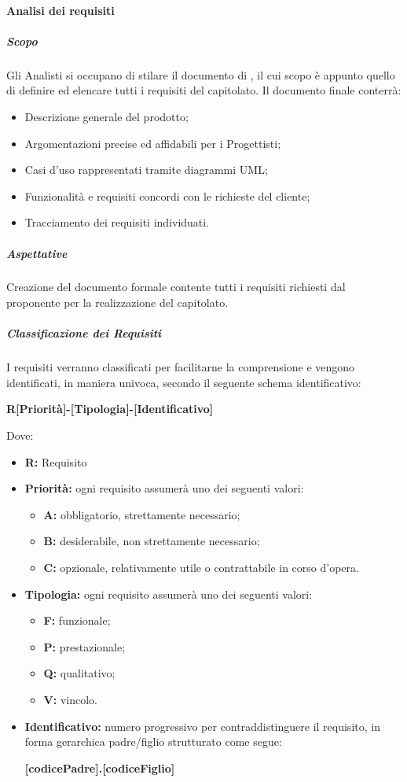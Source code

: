 			\paragraph{Analisi dei requisiti}
				\subparagraph{Scopo}
					Gli Analisti si occupano di stilare il documento di , il cui scopo è appunto quello di definire ed elencare tutti i requisiti del capitolato. Il documento finale conterrà:
					\begin{itemize}
						\item Descrizione generale del prodotto;
						\item Argomentazioni precise ed affidabili per i Progettisti;
						\item Casi d'uso rappresentati tramite diagrammi UML;
						\item Funzionalità e requisiti concordi con le richieste del cliente;
						\item Tracciamento dei requisiti individuati. 
					\end{itemize}
				\subparagraph{Aspettative}
					Creazione del documento formale contente tutti i requisiti richiesti dal proponente per la realizzazione del capitolato.
				\subparagraph{Classificazione dei Requisiti}
					I requisiti verranno classificati per facilitarne la comprensione e vengono identificati, in maniera univoca, secondo il seguente schema identificativo:
					\begin{center}
						\textbf{R[Priorità]-[Tipologia]-[Identificativo]}
					\end{center}
					Dove:
					\begin{itemize}
						\item \textbf{R:} Requisito 
						\item \textbf{Priorità:} ogni requisito assumerà uno dei seguenti valori:
						\begin{itemize}
							\item \textbf{A:} obbligatorio, strettamente necessario;
							\item \textbf{B:} desiderabile, non strettamente necessario;
							\item \textbf{C:} opzionale, relativamente utile o contrattabile in corso d'opera.
						\end{itemize}
						\item \textbf{Tipologia:} ogni requisito assumerà uno dei seguenti valori:
						\begin{itemize}
							\item \textbf{F:} funzionale;
							\item \textbf{P:} prestazionale;
							\item \textbf{Q:} qualitativo;
							\item \textbf{V:} vincolo.
						\end{itemize}
						\item \textbf{Identificativo:} numero progressivo per contraddistinguere il requisito, in forma gerarchica padre/figlio strutturato come segue: 
						\begin{center}
							\textbf{[codicePadre].[codiceFiglio]}
						\end{center}
					\end{itemize}
